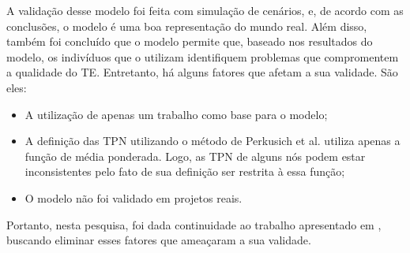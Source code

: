 A validação desse modelo foi feita com simulação de cenários, e, de acordo com as conclusões, o modelo é uma boa representação do mundo real. Além disso, também foi concluído que o modelo permite que, baseado nos resultados do modelo, os indivíduos que o utilizam identifiquem problemas que compromentem a qualidade do TE. Entretanto, há alguns fatores que afetam a sua validade. São eles:

\begin{itemize}
  \item A utilização de apenas um trabalho como base para o modelo;
  \item A definição das TPN utilizando o método de Perkusich et al. utiliza apenas a função de média ponderada. Logo, as TPN de alguns nós podem estar inconsistentes pelo fato de sua definição ser restrita à essa função;
  \item O modelo não foi validado em projetos reais.
\end{itemize}

Portanto, nesta pesquisa, foi dada continuidade ao trabalho apresentado em \cite{freire}, buscando eliminar esses fatores que ameaçaram a sua validade.

